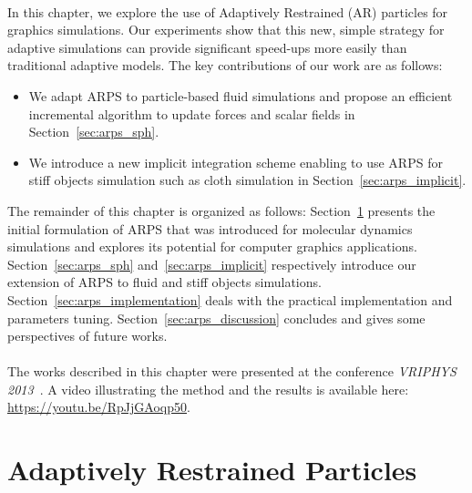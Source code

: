 \paragraph*{}
In this chapter, we explore the use of Adaptively Restrained (AR) particles for graphics simulations. Our experiments show that this new, simple strategy for adaptive simulations can provide significant speed-ups more easily than traditional adaptive models. The key contributions of our work are as follows: 
\begin{itemize}
\item We adapt ARPS to particle-based fluid simulations and propose an efficient incremental algorithm to update forces and scalar fields in Section~\ref{sec:arps_sph}.
\item We introduce a new implicit integration scheme enabling to use ARPS for stiff objects simulation such as cloth simulation in Section~\ref{sec:arps_implicit}.
\end{itemize}

The remainder of this chapter is organized as follows: 
Section~\ref{sec:arps_basics} presents the initial formulation of ARPS that was introduced for molecular dynamics simulations and explores its potential for computer graphics applications. 
Section~\ref{sec:arps_sph} and~\ref{sec:arps_implicit} respectively introduce our extension of ARPS to fluid and stiff objects simulations. 
Section~\ref{sec:arps_implementation} deals with the practical implementation and parameters tuning. 
Section~\ref{sec:arps_discussion} concludes and gives some perspectives of future works.
\paragraph*{}
The works described in this chapter were presented at the conference \emph{VRIPHYS 2013}~\cite{Manteaux2013}. A video illustrating the method and the results is available here: \url{https://youtu.be/RpJjGAoqp50}.
\section{Adaptively Restrained Particles} 
\label{sec:arps_basics}
